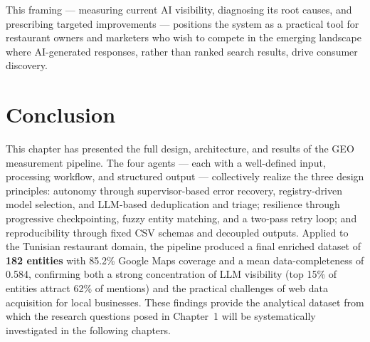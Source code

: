 This framing --- measuring current AI visibility, diagnosing its root causes,
and prescribing targeted improvements --- positions the system as a practical
tool for restaurant owners and marketers who wish to compete in the emerging
landscape where AI-generated responses, rather than ranked search results, drive
consumer discovery.

\section*{Conclusion}

This chapter has presented the full design, architecture, and results of the GEO
measurement pipeline. The four agents --- each with a well-defined input, processing
workflow, and structured output --- collectively realize the three design principles:
autonomy through supervisor-based error recovery, registry-driven model selection,
and LLM-based deduplication and triage; resilience through progressive checkpointing,
fuzzy entity matching, and a two-pass retry loop; and reproducibility through fixed
CSV schemas and decoupled outputs. Applied to the Tunisian restaurant domain, the
pipeline produced a final enriched dataset of \textbf{182 entities} with 85.2\%
Google Maps coverage and a mean data-completeness of 0.584, confirming both a
strong concentration of LLM visibility (top 15\% of entities attract 62\% of
mentions) and the practical challenges of web data acquisition for local businesses.
These findings provide the analytical dataset from which the research questions
posed in Chapter~1 will be systematically investigated in the following chapters.
